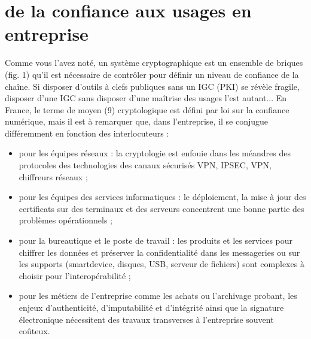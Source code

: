 \section{de la confiance aux usages en entreprise}
Comme vous l'avez noté, un système cryptographique est un ensemble de briques (fig. 1) qu'il est nécessaire de contrôler pour définir un niveau de confiance de la chaîne. Si disposer d'outils à clefs publiques sans un IGC (PKI) se révèle fragile, disposer d'une IGC sans disposer d'une maîtrise des usages l'est autant...
En France, le terme de moyen (9) cryptologique est défini par loi sur la confiance numérique, mais il est à remarquer que, dans l'entreprise, il se conjugue différemment en fonction des interlocuteurs :


\begin{itemize}
 \item pour les équipes réseaux : la cryptologie est enfouie dans les méandres des protocoles des technologies des canaux sécurisés VPN, IPSEC, VPN, chiffreurs réseaux ;
 \item pour les équipes des services informatiques : le déploiement, la mise à jour des certificats sur des terminaux et des serveurs concentrent une bonne partie des problèmes opérationnels ;
 \item pour la bureautique et le poste de travail : les produits et les services pour chiffrer les données et préserver la confidentialité dans les messageries ou sur les supports (smartdevice, disques, USB, serveur de fichiers) sont complexes à choisir pour l'interopérabilité ;
 \item pour les métiers de l'entreprise comme les achats ou l'archivage probant, les enjeux d'authenticité, d'imputabilité et d'intégrité ainsi que la signature électronique nécessitent des travaux transverses à l'entreprise souvent coûteux.
\end{itemize}



